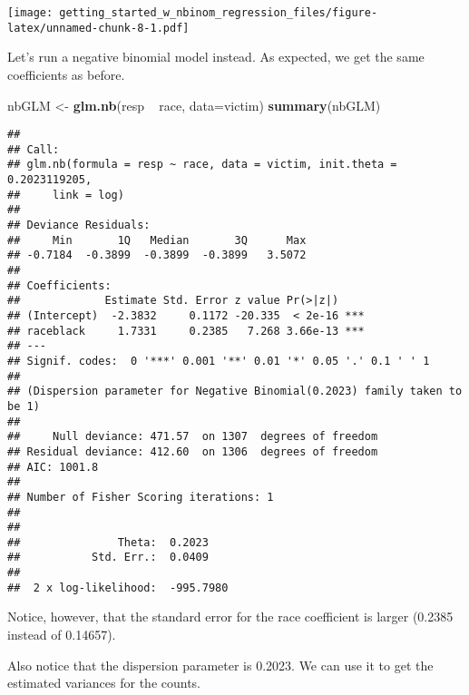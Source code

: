 \documentclass[]{article}
\newenvironment{Shaded}{\begin{snugshade}}{\end{snugshade}}
\newcommand{\KeywordTok}[1]{\textcolor[rgb]{0.13,0.29,0.53}{\textbf{{#1}}}}
\newcommand{\DataTypeTok}[1]{\textcolor[rgb]{0.13,0.29,0.53}{{#1}}}
\newcommand{\DecValTok}[1]{\textcolor[rgb]{0.00,0.00,0.81}{{#1}}}
\newcommand{\StringTok}[1]{\textcolor[rgb]{0.31,0.60,0.02}{{#1}}}
\newcommand{\CommentTok}[1]{\textcolor[rgb]{0.56,0.35,0.01}{\textit{{#1}}}}
\newcommand{\NormalTok}[1]{{#1}}
\begin{document}
\texttt{[image: getting\_started\_w\_nbinom\_regression\_files/figure-latex/unnamed-chunk-8-1.pdf]}

Let's run a negative binomial model instead. As expected, we get the
same coefficients as before.

\begin{Shaded}
\begin{Highlighting}[]
\NormalTok{nbGLM <-}\StringTok{ }\KeywordTok{glm.nb}\NormalTok{(resp ~}\StringTok{ }\NormalTok{race, }\DataTypeTok{data=}\NormalTok{victim)}
\KeywordTok{summary}\NormalTok{(nbGLM)}
\end{Highlighting}
\end{Shaded}

\begin{verbatim}
## 
## Call:
## glm.nb(formula = resp ~ race, data = victim, init.theta = 0.2023119205, 
##     link = log)
## 
## Deviance Residuals: 
##     Min       1Q   Median       3Q      Max  
## -0.7184  -0.3899  -0.3899  -0.3899   3.5072  
## 
## Coefficients:
##             Estimate Std. Error z value Pr(>|z|)    
## (Intercept)  -2.3832     0.1172 -20.335  < 2e-16 ***
## raceblack     1.7331     0.2385   7.268 3.66e-13 ***
## ---
## Signif. codes:  0 '***' 0.001 '**' 0.01 '*' 0.05 '.' 0.1 ' ' 1
## 
## (Dispersion parameter for Negative Binomial(0.2023) family taken to be 1)
## 
##     Null deviance: 471.57  on 1307  degrees of freedom
## Residual deviance: 412.60  on 1306  degrees of freedom
## AIC: 1001.8
## 
## Number of Fisher Scoring iterations: 1
## 
## 
##               Theta:  0.2023 
##           Std. Err.:  0.0409 
## 
##  2 x log-likelihood:  -995.7980
\end{verbatim}

Notice, however, that the standard error for the race coefficient is
larger (0.2385 instead of 0.14657).

Also notice that the dispersion parameter is 0.2023. We can use it to
get the estimated variances for the counts.

\begin{Shaded}
\end{Shaded}
\end{document}
